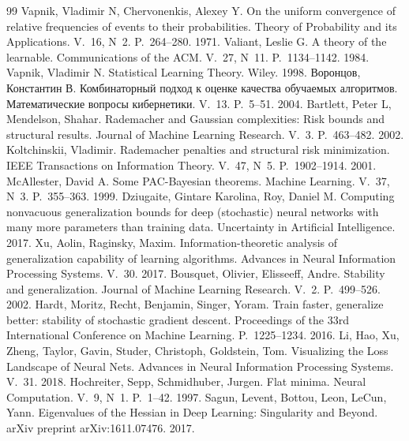 \renewcommand\bibname{Список литературы}
\begin{thebibliography}{99}
 Vapnik, Vladimir N, Chervonenkis, Alexey Y. On the uniform convergence of relative frequencies of events to their probabilities. Theory of Probability and its Applications. V.~16, N~2. P.~264--280. 1971.
 Valiant, Leslie G. A theory of the learnable. Communications of the ACM. V.~27, N~11. P.~1134--1142. 1984.
 Vapnik, Vladimir N. Statistical Learning Theory. Wiley. 1998.
 Воронцов, Константин В. Комбинаторный подход к оценке качества обучаемых алгоритмов. Математические вопросы кибернетики. V.~13. P.~5--51. 2004.
 Bartlett, Peter L, Mendelson, Shahar. Rademacher and Gaussian complexities: Risk bounds and structural results. Journal of Machine Learning Research. V.~3. P.~463--482. 2002.
 Koltchinskii, Vladimir. Rademacher penalties and structural risk minimization. IEEE Transactions on Information Theory. V.~47, N~5. P.~1902--1914. 2001.
 McAllester, David A. Some PAC-Bayesian theorems. Machine Learning. V.~37, N~3. P.~355--363. 1999.
 Dziugaite, Gintare Karolina, Roy, Daniel M. Computing nonvacuous generalization bounds for deep (stochastic) neural networks with many more parameters than training data. Uncertainty in Artificial Intelligence. 2017.
 Xu, Aolin, Raginsky, Maxim. Information-theoretic analysis of generalization capability of learning algorithms. Advances in Neural Information Processing Systems. V.~30. 2017.
 Bousquet, Olivier, Elisseeff, Andre. Stability and generalization. Journal of Machine Learning Research. V.~2. P.~499--526. 2002.
 Hardt, Moritz, Recht, Benjamin, Singer, Yoram. Train faster, generalize better: stability of stochastic gradient descent. Proceedings of the 33rd International Conference on Machine Learning. P.~1225--1234. 2016.
 Li, Hao, Xu, Zheng, Taylor, Gavin, Studer, Christoph, Goldstein, Tom. Visualizing the Loss Landscape of Neural Nets. Advances in Neural Information Processing Systems. V.~31. 2018.
 Hochreiter, Sepp, Schmidhuber, Jurgen. Flat minima. Neural Computation. V.~9, N~1. P.~1--42. 1997.
 Sagun, Levent, Bottou, Leon, LeCun, Yann. Eigenvalues of the Hessian in Deep Learning: Singularity and Beyond. arXiv preprint arXiv:1611.07476. 2017.

\end{thebibliography}
